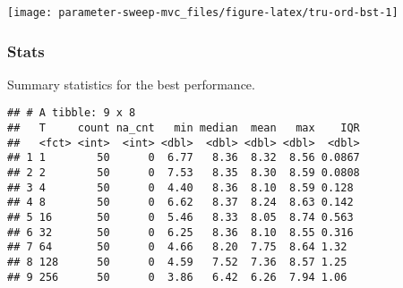 \documentclass[]{book}
\newenvironment{Shaded}{\begin{snugshade}}{\end{snugshade}}
\newcommand{\DataTypeTok}[1]{\textcolor[rgb]{0.13,0.29,0.53}{#1}}
\newcommand{\KeywordTok}[1]{\textcolor[rgb]{0.13,0.29,0.53}{\textbf{#1}}}
\newcommand{\NormalTok}[1]{#1}
\newcommand{\OperatorTok}[1]{\textcolor[rgb]{0.81,0.36,0.00}{\textbf{#1}}}
\newcommand{\OtherTok}[1]{\textcolor[rgb]{0.56,0.35,0.01}{#1}}
\newcommand{\StringTok}[1]{\textcolor[rgb]{0.31,0.60,0.02}{#1}}
\begin{document}
\texttt{[image: parameter-sweep-mvc\_files/figure-latex/tru-ord-bst-1]}

\hypertarget{stats-2}{%
\subsubsection{Stats}\label{stats-2}}

Summary statistics for the best performance.

\begin{Shaded}
\end{Shaded}

\begin{verbatim}
## # A tibble: 9 x 8
##   T     count na_cnt   min median  mean   max    IQR
##   <fct> <int>  <int> <dbl>  <dbl> <dbl> <dbl>  <dbl>
## 1 1        50      0  6.77   8.36  8.32  8.56 0.0867
## 2 2        50      0  7.53   8.35  8.30  8.59 0.0808
## 3 4        50      0  4.40   8.36  8.10  8.59 0.128 
## 4 8        50      0  6.62   8.37  8.24  8.63 0.142 
## 5 16       50      0  5.46   8.33  8.05  8.74 0.563 
## 6 32       50      0  6.25   8.36  8.10  8.55 0.316 
## 7 64       50      0  4.66   8.20  7.75  8.64 1.32  
## 8 128      50      0  4.59   7.52  7.36  8.57 1.25  
## 9 256      50      0  3.86   6.42  6.26  7.94 1.06
\end{verbatim}
\end{document}
